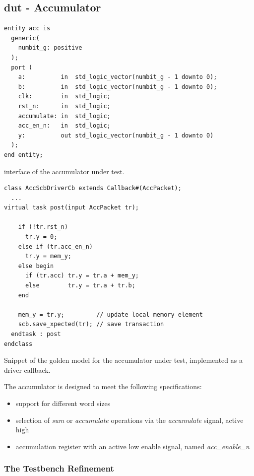 \subsection{\acs{dut} - Accumulator}\label{subsec:dut_acc}

\begin{listing}
\begin{verbatim}
entity acc is
  generic(
    numbit_g: positive
  );
  port (
    a:          in  std_logic_vector(numbit_g - 1 downto 0);
    b:          in  std_logic_vector(numbit_g - 1 downto 0);
    clk:        in  std_logic;
    rst_n:      in  std_logic;
    accumulate: in  std_logic;
    acc_en_n:   in  std_logic;
    y:          out std_logic_vector(numbit_g - 1 downto 0)
  );
end entity;
\end{verbatim}
\caption{\vhdl interface of the accumulator under test.}
\label{list:dut_acc}
\end{listing}

\begin{listing}
\begin{verbatim}
class AccScbDriverCb extends Callback#(AccPacket);
  ...
virtual task post(input AccPacket tr);

    if (!tr.rst_n)
      tr.y = 0;
    else if (tr.acc_en_n)
      tr.y = mem_y;
    else begin
      if (tr.acc) tr.y = tr.a + mem_y;
      else        tr.y = tr.a + tr.b;
    end

    mem_y = tr.y;         // update local memory element
    scb.save_xpected(tr); // save transaction
  endtask : post
endclass
\end{verbatim}
\caption{Snippet of the golden model for the accumulator under test, implemented as a driver callback.}
\label{list:acc_golden}
\end{listing}

\noindent The accumulator is designed to meet the following specifications:
\begin{itemize}
    \item support for different word sizes
    \item selection of \emph{sum} or \emph{accumulate} operations via the \emph{accumulate} signal, active high
    \item accumulation register with an active low enable signal, named \emph{acc\_enable\_n}
\end{itemize}

\subsubsection{The Testbench Refinement}

